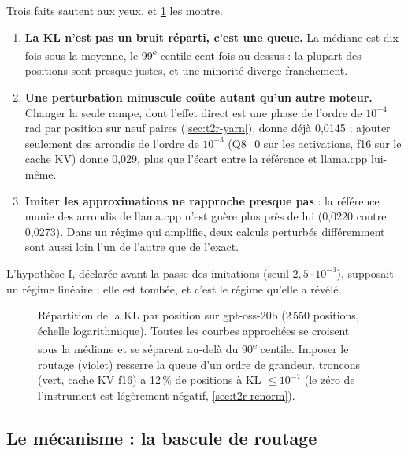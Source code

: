 Trois faits sautent aux yeux, et \cref{fig:t2r-repartition} les montre.
\begin{enumerate}
\item \textbf{La KL n'est pas un bruit réparti, c'est une queue.} La médiane est dix fois sous la moyenne, le 99\textsuperscript{e} centile cent fois au-dessus : la plupart des positions sont presque justes, et une minorité diverge franchement.
\item \textbf{Une perturbation minuscule coûte autant qu'un autre moteur.} Changer la seule rampe, dont l'effet direct est une phase de l'ordre de $10^{-4}$\,rad par position sur neuf paires (\cref{sec:t2r-yarn}), donne déjà 0,0145 ; ajouter seulement des arrondis de l'ordre de $10^{-3}$ (Q8\_0 sur les activations, f16 sur le cache KV) donne 0,029, plus que l'écart entre la référence et llama.cpp lui-même.
\item \textbf{Imiter les approximations ne rapproche presque pas} : la référence munie des arrondis de llama.cpp n'est guère plus près de lui (0,0220 contre 0,0273). Dans un régime qui amplifie, deux calculs perturbés différemment sont aussi loin l'un de l'autre que de l'exact.
\end{enumerate}
L'hypothèse I, déclarée avant la passe des imitations (seuil $2{,}5\cdot10^{-3}$), supposait un régime linéaire ; elle est tombée, et c'est le régime qu'elle a révélé.

\begin{figure}[ht]
\centering
\GrapheRefRepartition
\caption[La KL par position est une queue]{Répartition de la KL par position sur gpt-oss-20b (2\,550 positions, échelle logarithmique). Toutes les courbes approchées se croisent sous la médiane et se séparent au-delà du 90\textsuperscript{e} centile. Imposer le routage (violet) resserre la queue d'un ordre de grandeur. troncons (vert, cache KV f16) a 12\,\% de positions à KL $\le 10^{-7}$ (le zéro de l'instrument est légèrement négatif, \cref{sec:t2r-renorm}).}
\label{fig:t2r-repartition}
\end{figure}

\subsection{Le mécanisme : la bascule de routage}\label{sec:t2r-bascule}

